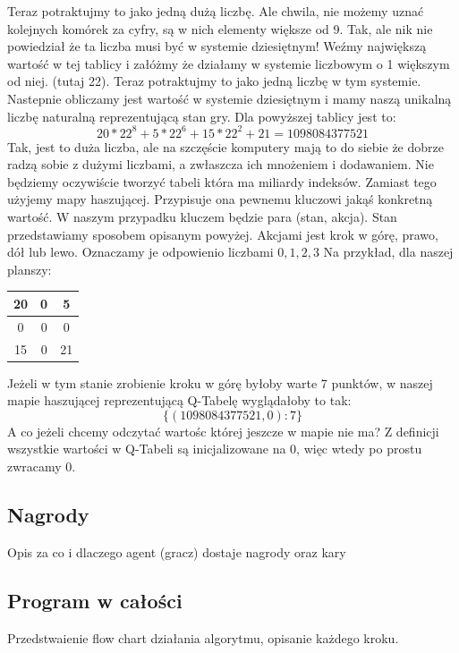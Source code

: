 \documentclass[a4paper,12pt]{article}
\begin{document}
Teraz potraktujmy to jako jedną dużą liczbę. Ale chwila, nie możemy uznać kolejnych komórek za cyfry, są w nich elementy większe od 9. Tak, ale nik nie powiedział że ta liczba musi być w systemie dziesiętnym! Weźmy największą wartość w tej tablicy i załóżmy że działamy w systemie liczbowym o 1 większym od niej. (tutaj 22). Teraz potraktujmy to jako jedną liczbę w tym systemie. Nastepnie obliczamy jest wartość w systemie dziesiętnym i mamy naszą unikalną liczbę naturalną reprezentującą stan gry. Dla powyższej tablicy jest to:
\[20*22^8 + 5*22^6 + 15*22^2 + 21 = 1098084377521\]
Tak, jest to duża liczba, ale na szczęście komputery mają to do siebie że dobrze radzą sobie z dużymi liczbami, a zwłaszcza ich mnożeniem i dodawaniem.
\newline \newline Nie będziemy oczywiście tworzyć tabeli która ma miliardy indeksów. Zamiast tego użyjemy mapy haszującej. Przypisuje ona pewnemu kluczowi jakąś konkretną wartość. W naszym przypadku kluczem będzie para (stan, akcja). Stan przedstawiamy sposobem opisanym powyżej. Akcjami jest krok w górę, prawo, dół lub lewo. Oznaczamy je odpowienio liczbami \(0, 1, 2, 3\)
Na przykład, dla naszej planszy:
\begin{center}
\begin{tabular}{ |c|c|c| }
\hline
20 & 0 & 5 \\
\hline
0 & 0 & 0 \\
\hline
15 & 0 & 21 \\
\hline
\end{tabular}
\end{center} 
Jeżeli w tym stanie zrobienie kroku w górę byłoby warte 7 punktów, w naszej mapie haszującej reprezentującą Q-Tabelę wyglądałoby to tak:
\[\{ (1098084377521, 0) : 7 \}\]
A co jeżeli chcemy odczytać wartośc której jeszcze w mapie nie ma? Z definicji wszystkie wartości w Q-Tabeli są inicjalizowane na 0, więc wtedy po prostu zwracamy 0.

\subsection{Nagrody}

Opis za co i dlaczego agent (gracz) dostaje nagrody oraz kary

\subsection{Program w całości}

Przedstwaienie flow chart działania algorytmu, opisanie każdego kroku.
\end{document}
